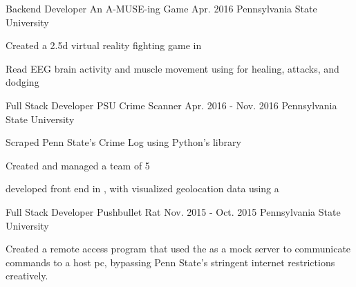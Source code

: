 \begin{cventries}
%
  \cventry
    {Backend Developer} %
    {An A-MUSE-ing Game} %
    {Apr. 2016} %
    {Pennsylvania State University} %
    {
      \begin{cvitems} %
        \item {Created a 2.5d virtual reality fighting game in }
        \item {Read EEG brain activity and muscle movement using  for healing, attacks, and dodging}
      \end{cvitems}
    }

  \cventry
    {Full Stack Developer} %
    {PSU Crime Scanner} %
    {Apr. 2016 - Nov. 2016} %
    {Pennsylvania State University} %
    {
      \begin{cvitems} %
        \item {Scraped Penn State’s Crime Log using Python's  library}
        \item {Created and managed a team of 5}
        \item {developed front end in , with visualized geolocation data using a }
      \end{cvitems}
    }
  \cventry
    {Full Stack Developer} %
    {Pushbullet Rat} %
    {Nov. 2015 - Oct. 2015} %
    {Pennsylvania State University} %
    {
      \begin{cvitems} %
        \item {Created a remote access program that used the  as a mock server to communicate commands to a host pc, bypassing Penn State’s stringent internet restrictions creatively.}
      \end{cvitems}
    }
    

\end{cventries}



